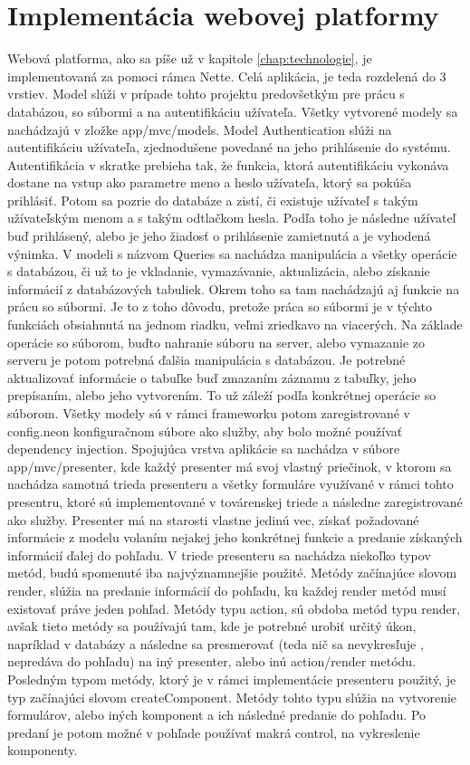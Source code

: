\section{Implementácia webovej platformy}
Webová platforma, ako sa píše už v kapitole \ref{chap:technologie}, je implementovaná za pomoci rámca Nette. Celá aplikácia, je teda rozdelená do 3 vrstiev. Model slúži v prípade tohto projektu predovšetkým pre prácu s databázou, so súbormi a na autentifikáciu užívateľa. Všetky vytvorené modely sa nachádzajú v zložke app/mvc/models. Model Authentication slúži na autentifikáciu užívateľa, zjednodušene povedané na jeho prihlásenie do systému. Autentifikácia v skratke prebieha tak, že funkcia, ktorá autentifikáciu vykonáva dostane na vstup ako parametre meno a heslo užívateľa, ktorý sa pokúša prihlásiť. Potom sa pozrie do databáze a zistí, či existuje užívateľ s takým užívateľským menom a s takým odtlačkom hesla. Podľa toho je následne užívateľ buď prihlásený, alebo je jeho žiadosť o prihlásenie zamietnutá a je vyhodená výnimka. V modeli s názvom Queries sa nachádza manipulácia a všetky operácie s databázou, či už to je vkladanie, vymazávanie, aktualizácia, alebo získanie informácií z databázových tabuliek. Okrem toho sa tam nachádzajú aj funkcie na prácu so súbormi. Je to z toho dôvodu, pretože práca so súbormi je v týchto funkciách obsiahnutá na jednom riadku, veľmi zriedkavo na viacerých. Na základe operácie so súborom, buďto nahranie súboru na server, alebo vymazanie zo serveru je potom potrebná ďalšia manipulácia s databázou. Je potrebné aktualizovať informácie o tabuľke buď zmazaním záznamu z tabuľky, jeho prepísaním, alebo jeho vytvorením. To už záleží podľa konkrétnej operácie so súborom. Všetky modely sú v rámci frameworku potom zaregistrované v config.neon konfiguračnom súbore ako služby, aby bolo možné používať dependency injection. 
Spojujúca vrstva aplikácie sa nachádza v súbore app/mvc/presenter, kde každý presenter má svoj vlastný priečinok, v ktorom sa nachádza samotná trieda presenteru a všetky formuláre využívané v rámci tohto presentru, ktoré sú implementované v továrenskej triede a následne zaregistrované ako služby. Presenter má na starosti vlastne jedinú vec, získať požadované informácie z modelu volaním nejakej jeho konkrétnej funkcie a predanie získaných informácií ďalej do pohľadu. V triede presenteru sa nachádza niekoľko typov metód, budú spomenuté iba najvýznamnejšie použité. Metódy začínajúce slovom render, slúžia na predanie informácií do pohľadu, ku každej render metód musí existovať práve jeden pohľad. Metódy typu action, sú obdoba metód typu render, avšak tieto metódy sa používajú tam, kde je potrebné urobiť určitý úkon, napríklad v databázy a následne sa presmerovať (teda nič sa nevykresľuje , nepredáva do pohľadu) na iný presenter, alebo inú action/render metódu. Posledným typom metódy, ktorý je v rámci implementácie presenteru použitý, je typ začínajúci slovom createComponent. Metódy tohto typu slúžia na vytvorenie formulárov, alebo iných komponent a ich následné predanie do pohľadu. Po predaní je potom možné v pohľade používať makrá {control}, na vykreslenie komponenty. 
